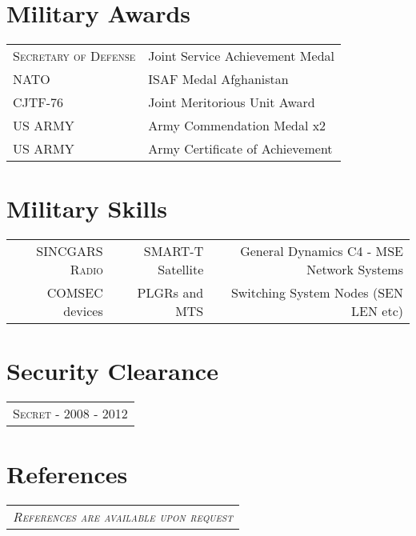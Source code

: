 \documentclass[a4paper,10pt]{article}
\newcommand{\fivenotes}{%
\textcolor{noteone}{\symbol{"2022}}
\textcolor{notetwo}{\symbol{"2022}}
\textcolor{notethree}{\symbol{"2022}}
\textcolor{notefour}{\symbol{"2022}}
\textcolor{notefive}{\symbol{"2022}}
}
\newcommand{\fournotes}{%
\textcolor{noteone}{\symbol{"2022}}
\textcolor{notetwo}{\symbol{"2022}}
\textcolor{notethree}{\symbol{"2022}}
\textcolor{notefour}{\symbol{"2022}}
\textcolor{white}{\symbol{"2022}}
}
\newcommand{\threenotes}{%
\textcolor{noteone}{\symbol{"2022}}
\textcolor{notetwo}{\symbol{"2022}}
\textcolor{notethree}{\symbol{"2022}}
\textcolor{white}{\symbol{"2022}}
\textcolor{white}{\symbol{"2022}}
}
\begin{document}
\section{Military Awards}
\begin{tabular}{l|p{15.5cm}}
 \textsc{Secretary of Defense} & Joint Service Achievement Medal 
  \\ \textsc{NATO} & ISAF Medal Afghanistan 
  \\ \textsc{CJTF-76} & Joint Meritorious Unit Award 
  \\ \textsc{US ARMY} & Army Commendation Medal x2 
  \\ \textsc{US ARMY} & Army Certificate of Achievement 
\end{tabular} 

\section{Military Skills}
\begin{tabular}{r r r }
 \textsc{SINCGARS Radio}\small\emph{\fivenotes} & SMART-T Satellite \small\emph{\fournotes} & General Dynamics C4 - MSE Network Systems\small\emph{\fournotes} \\ COMSEC devices\small\emph{\fournotes} & PLGRs and MTS \small\emph{\threenotes} & Switching System Nodes (SEN LEN etc) \small\emph{\threenotes}
\end{tabular}

\section{Security Clearance}
 \begin{tabular}{p{15.5cm}}
 \textsc{Secret - 2008 - 2012}
\end{tabular}

\section{References}
 \begin{tabular}{p{15.5cm}}
 \textsc{\emph{References are available upon request}}
\end{tabular}
\end{document}
